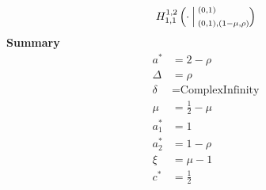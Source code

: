 \documentclass{article}
\newcommand{\FoxH}[5]{H_{#2}^{#1}\left(#3\:\middle\vert\: \begin{subarray}{l}#4\\[0.4em] #5\end{subarray}\right)}
\begin{document}
\begin{align*}
\FoxH{1,2}{1,1}{\cdot}{\left(0, 1\right)}{\left(0, 1\right), \left(1-\mu, \rho\right)}
\end{align*}
\noindent\textbf{Summary}
\begin{align*}
a^* &= 2-\rho \\
\Delta &= \rho \\
\delta &= \text{ComplexInfinity} \\
\mu &= \frac{1}{2}-\mu \\
a_1^* &= 1 \\
a_2^* &= 1-\rho \\
\xi &= \mu -1 \\
c^* &= \frac{1}{2} \\
\end{align*}
\end{document}
